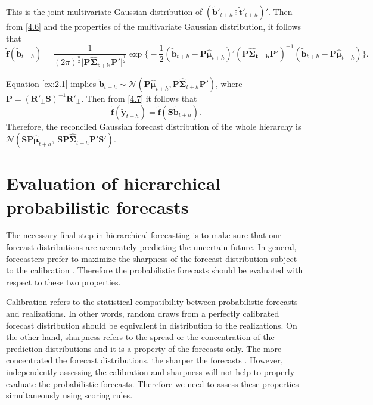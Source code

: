 \documentclass[a4paper, 11pt]{article}
\begin{document}
This is the joint multivariate Gaussian distribution of $(\tilde{\bm{b}}'_{t+h} ~ \vdots~ \tilde{\bm{t}}'_{t+h})'$. Then from \eqref{4.6} and the properties of the multivariate Gaussian distribution, it follows that
\begin{equation}\label{ex:2.1}
\tilde{\bm{f}}(\tilde{\bm{b}}_{t+h})=\frac{1}{(2\pi)^{\frac{n}{2}}\Big|\bm{P}\bm{\hat{\Sigma}_{t+h}}\bm{P}'\Big|^{\frac{1}{2}}}
\exp \Big\{-\frac{1}{2} (\tilde{\bm{b}}_{t+h} - \bm{P}\bm{\hat{\mu}}_{t+h})' (\bm{P}\bm{\hat{\Sigma}_{t+h}}\bm{P}')^{-1}(\tilde{\bm{b}}_{t+h} - \bm{P}\bm{\hat{\mu}}_{t+h}) \Big\}.
\end{equation}

Equation \eqref{ex:2.1} implies $\tilde{\bm{b}}_{t+h} \sim \mathcal{N}(\bm{P}\bm{\hat{\mu}}_{t+h}, \bm{P}\hat{\bm{\Sigma}}_{t+h}\bm{P}')$, where $\bm{P} = (\bm{R}'_\bot \bm{S})^{-1}\bm{R}'_\bot$. Then from \eqref{4.7} it follows that
\begin{equation}\label{eq:gaussianreconciled}
\tilde{\bm{f}}(\tilde{\bm{y}}_{t+h})=\tilde{\bm{f}}(\bm{S}\tilde{\bm{b}}_{t+h}).
\end{equation}
Therefore, the reconciled Gaussian forecast distribution of the whole hierarchy is\\
$\mathcal{N}(\bm{SP}\bm{\hat{\mu}}_{t+h},~ \bm{SP}\hat{\bm{\Sigma}}_{t+h}\bm{P}'\bm{S}')$.

\section{Evaluation of hierarchical probabilistic forecasts}\label{sec:evaluation}

The necessary final step in hierarchical forecasting is to make sure that our forecast distributions are accurately predicting the uncertain future. In general, forecasters prefer to maximize the sharpness of the forecast distribution subject to the calibration \citep{Gneiting2014}. Therefore the probabilistic forecasts should be evaluated with respect to these two properties.

Calibration refers to the statistical compatibility between probabilistic forecasts and realizations. In other words, random draws from a perfectly calibrated forecast distribution should be equivalent in distribution to the realizations. On the other hand, sharpness refers to the spread or the concentration of the prediction distributions and it is a property of the forecasts only. The more concentrated the forecast distributions, the sharper the forecasts \citep{Gneiting2008}. However, independently assessing the calibration and sharpness will not help to properly evaluate the probabilistic forecasts. Therefore we need to assess these properties simultaneously using scoring rules.
\end{document}

